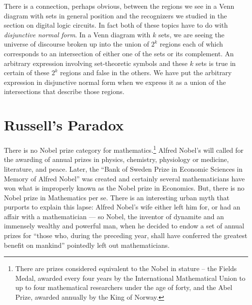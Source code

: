 There is a connection, perhaps obvious, between the regions we
see in a Venn diagram with sets in general position and the recognizers
we studied in the section on digital logic circuits.  In fact both
of these topics have to do with \emph{disjunctive normal form}.  In a Venn diagram with $k$ sets, we are seeing the universe
of discourse broken up into the union of $2^k$ regions each of which 
corresponds to an intersection of either one of the sets or its complement.
An arbitrary expression involving set-theoretic symbols and these $k$ sets
is true in certain of these $2^k$ regions and false in the others.  
We have put the arbitrary expression in disjunctive normal form when
we express it as a union of the intersections that describe those regions.

\vspace{.1in}


 

\clearpage 




\newpage

\section{Russell's Paradox}
\label{sec:russell}

There is no Nobel prize category for mathematics.\footnote{There are prizes
considered equivalent to the Nobel in stature -- the Fields Medal, awarded every four years by the International Mathematical Union to up to four mathematical researchers under the age of forty, and the Abel Prize, awarded annually by the King of Norway.}   Alfred Nobel's will
called for the awarding of annual prizes in physics, chemistry, physiology 
or medicine, literature, and peace.  Later, the 
``Bank of Sweden Prize in Economic Sciences in Memory of Alfred Nobel'' 
was created and certainly several mathematicians have won what is 
improperly known as the Nobel prize in Economics.  But, there is no 
Nobel prize in Mathematics per se.  There is an interesting urban myth that
purports to explain this lapse: Alfred Nobel's wife either left him for, or
had an affair with a mathematician --- so Nobel, the inventor of dynamite
and an immensely wealthy and powerful man, when he decided to endow 
a set of annual prizes for ``those who, during the preceding year, shall have conferred the greatest benefit on mankind'' pointedly left out mathematicians.

